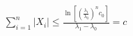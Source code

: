 \documentclass[preview]{standalone}
\begin{document}
\begin{align*}
\sum_{i=1}^n |X_i| \leq \frac{\ln\left[\left(\frac{\lambda_1}{\lambda_0}\right)^n c_0\right]}{\lambda_1-\lambda_0} = c
\end{align*}
\end{document}
